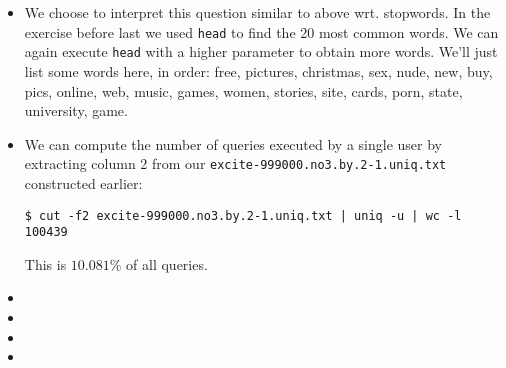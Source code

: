 \begin{itemize}
We proceed in a manner similar to above, except that instead of simply
\texttt{cat}ing the normalized queries, we'll only pick those that contain the
word download:

\begin{verbatim}
$ grep "download" queries.normalized.txt | tr '[[:punct:][:space:]]' '\n' | \
  sed '/^$/d' > words.txt
$ sort words.txt | uniq -c | sort -nr | head -20
   3441 download
   1623 i
   1503 can
   1442 where
   1110 downloads
    927 and
    837 free
    395 for
    394 games
    343 the
    326 find
    325 to
    282 mp3
    256 game
    252 a
    237 music
    190 of
    133 downloadable
    125 or
    109 software
\end{verbatim}

As might be expected, people are looking for free downloads of games, music
(mp3), and software. We can execute \texttt{head} with a higher parameter to
obtain more words. We'll just list some words here, in order: pokemon, full,
windows, christmas, mac, player, pc, internet, demo, funny, computer, files,
cd, program, version, mp3s, songs, roms, driver, microsoft.

\item

We choose to interpret this question similar to above wrt. stopwords. In the
exercise before last we used \texttt{head} to find the 20 most common words. We
can again execute \texttt{head} with a higher parameter to obtain more words.
We'll just list some words here, in order: free, pictures, christmas, sex,
nude, new, buy, pics, online, web, music, games, women, stories, site, cards,
porn, state, university, game.

\item

We can compute the number of queries executed by a single user by extracting
column 2 from our \texttt{excite-999000.no3.by.2-1.uniq.txt} constructed
earlier:

\begin{verbatim}
$ cut -f2 excite-999000.no3.by.2-1.uniq.txt | uniq -u | wc -l
100439
\end{verbatim}

This is $10.081\%$ of all queries.

\item

\item

\item

\item


\end{itemize}
